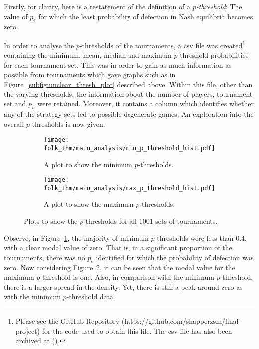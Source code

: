 Firstly, for clarity, here is a restatement of the definition of a
\textit{\(p\)-threshold}: The value of \(p_{e}\) for which the
least probability of defection in Nash equilibria becomes zero.

In order to analyse the \(p\)-thresholds of the tournaments, a csv file was
created\footnote{Please see the GitHub Repository
(https://github.com/shapperzsm/final-project) for the code used to obtain this
file. The csv file has also been archived at ().}
containing the
minimum, mean, median and maximum \(p\)-threshold probabilities for each
tournament set.
This was in order to gain as much information as possible from tournaments which
gave graphs such as in Figure~\ref{subfig:unclear_thresh_plot} described above. 
Within this file, other than the varying thresholds, the
information about the number of players, tournament set and \(p_{n}\) were
retained. Moreover, it contains a column which identifies whether any
of the strategy sets led to possible degenerate games. An exploration into the overall \(p\)-thresholds is now given.

\begin{figure}
    \centering
    \begin{subfigure}{0.45\textwidth}
        \centering
        \texttt{[image: folk\_thm/main\_analysis/min\_p\_threshold\_hist.pdf]}
        \caption{A plot to show the minimum \(p\)-thresholds.}\label{subfig:min_p_thresh}
    \end{subfigure}
    \hspace{3pt}
    \begin{subfigure}{0.45\textwidth}
        \centering
        \texttt{[image: folk\_thm/main\_analysis/max\_p\_threshold\_hist.pdf]}
        \caption{A plot to show the maximum \(p\)-thresholds.}\label{subfig:max_p_thresh}
    \end{subfigure}
    \caption{Plots to show the \(p\)-thresholds for all 1001 sets of tournaments.}\label{fig:min_max_p_thresh}
\end{figure}

Observe, in Figure~\ref{subfig:min_p_thresh}, the majority of minimum \(p\)-thresholds
were less than 0.4, with a clear modal value of zero. That is, in a significant
proportion of the tournaments, there was no \(p_{e}\)
identified for
which the probability of defection was zero. Now considering Figure~\ref{subfig:max_p_thresh}, it can be seen that the modal value for the
maximum \(p\)-threshold is one.
Also, in comparison with the minimum \(p\)-threshold, there is a larger spread in the
density. Yet, there is still a peak around zero as with the minimum \(p\)-threshold
data. 

